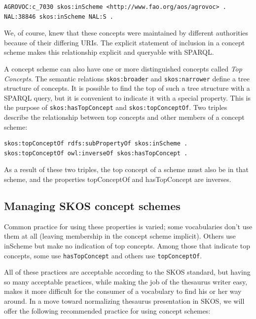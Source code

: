 \begin{lstlisting}
AGROVOC:c_7030 skos:inScheme <http://www.fao.org/aos/agrovoc> .
NAL:38846 skos:inScheme NAL:S .
\end{lstlisting}

We, of course, knew that these concepts were maintained by different
authorities because of their differing URIs. The explicit statement of
inclusion in a concept scheme makes this relationship explicit and
queryable with SPARQL.

A concept scheme can also have one or more distinguished concepts called
\emph{Top Concepts}. The semantic relations \texttt{skos:broader} and \texttt{skos:narrower}
define a tree structure of concepts. It is possible to find the top of
such a tree structure with a SPARQL query, but it is convenient to
indicate it with a special property. This is the purpose of
\texttt{skos:hasTopConcept} and \texttt{skos:topConceptOf}. Two triples describe the
relationship between top concepts and other members of a concept scheme:

\begin{lstlisting}
skos:topConceptOf rdfs:subPropertyOf skos:inScheme .
skos:topConceptOf owl:inverseOf skos:hasTopConcept .
\end{lstlisting}

As a result of these two triples, the top concept of a scheme must also
be in that scheme, and the properties topConceptOf and hasTopConcept are
inverses.

\subsection{Managing SKOS concept schemes}

Common practice for using these properties is varied; some vocabularies
don't use them at all (leaving membership in the concept scheme
implicit). Others use inScheme but make no indication of top concepts.
Among those that indicate top concepts, some use \texttt{hasTopConcept} and
others use \texttt{topConceptOf}.

All of these practices are acceptable according to the SKOS standard,
but having so many
acceptable practices, while making the job of the thesaurus writer easy,
makes it more difficult for the consumer of a vocabulary to find his or
her way around. In a move toward normalizing thesaurus presentation in
SKOS, we will offer the following recommended practice for using concept
schemes:

